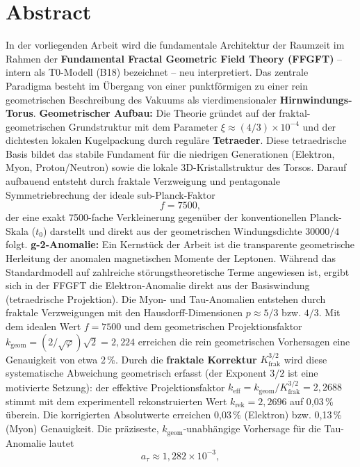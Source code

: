 \section*{Abstract}
		In der vorliegenden Arbeit wird die fundamentale Architektur der Raumzeit im Rahmen der \textbf{Fundamental Fractal Geometric Field Theory (FFGFT)} – intern als T0-Modell (B18) bezeichnet – neu interpretiert. Das zentrale Paradigma besteht im Übergang von einer punktförmigen zu einer rein geometrischen Beschreibung des Vakuums als vierdimensionaler \textbf{Hirnwindungs-Torus}.
		\textbf{Geometrischer Aufbau:} Die Theorie gründet auf der fraktal-geometrischen Grundstruktur mit dem Parameter $\xi \approx (4/3)\times 10^{-4}$ und der dichtesten lokalen Kugelpackung durch reguläre \textbf{Tetraeder}. Diese tetraedrische Basis bildet das stabile Fundament für die niedrigen Generationen (Elektron, Myon, Proton/Neutron) sowie die lokale 3D-Kristallstruktur des Torsos. Darauf aufbauend entsteht durch fraktale Verzweigung und pentagonale Symmetriebrechung der ideale sub-Planck-Faktor
		\begin{equation*}
			f = 7500,
		\end{equation*}
		der eine exakt 7500-fache Verkleinerung gegenüber der konventionellen Planck-Skala ($t_0$) darstellt und direkt aus der geometrischen Windungsdichte $30000/4$ folgt.
		\textbf{g-2-Anomalie:} Ein Kernstück der Arbeit ist die transparente geometrische Herleitung der anomalen magnetischen Momente der Leptonen. Während das Standardmodell auf zahlreiche störungstheoretische Terme angewiesen ist, ergibt sich in der FFGFT die Elektron-Anomalie direkt aus der Basiswindung (tetraedrische Projektion). Die Myon- und Tau-Anomalien entstehen durch fraktale Verzweigungen mit den Hausdorff-Dimensionen $p \approx 5/3$ bzw. $4/3$. Mit dem idealen Wert $f = 7500$ und dem geometrischen Projektionsfaktor $k_\text{geom} = (2/\sqrt{\varphi})\sqrt{2} = 2{,}224$ erreichen die rein geometrischen Vorhersagen eine Genauigkeit von etwa 2\,\%. Durch die \textbf{fraktale Korrektur} $K_\text{frak}^{3/2}$ wird diese systematische Abweichung geometrisch erfasst (der Exponent $3/2$ ist eine motivierte Setzung): der effektive Projektionsfaktor $k_\text{eff} = k_\text{geom} / K_\text{frak}^{3/2} = 2{,}2688$ stimmt mit dem experimentell rekonstruierten Wert $k_\text{rek} = 2{,}2696$ auf 0{,}03\,\% überein. Die korrigierten Absolutwerte erreichen 0{,}03\,\% (Elektron) bzw. 0{,}13\,\% (Myon) Genauigkeit. Die präziseste, $k_\text{geom}$-unabhängige Vorhersage für die Tau-Anomalie lautet
		\begin{equation*}
			a_\tau \approx 1{,}282 \times 10^{-3},
		\end{equation*}
